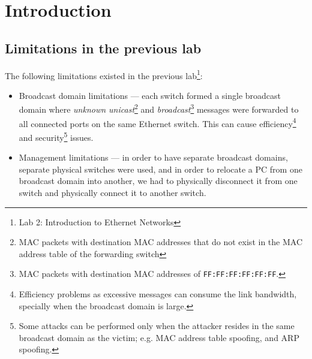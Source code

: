 \documentclass[pdftex,12pt,a4paper]{article}
\begin{document}
    \section{Introduction}
        \subsection{Limitations in the previous lab}
            The following limitations existed in the previous lab\footnote{Lab 2:
            Introduction to Ethernet Networks}:
            \begin{itemize}
                \item Broadcast domain limitations --- each switch formed a single
                    broadcast domain where \emph{unknown unicast}\footnote{MAC
                    packets with destination MAC addresses that do not exist in the
                    MAC address table of the forwarding switch} and
                    \emph{broadcast}\footnote{MAC packets with destination MAC
                    addresses of \texttt{FF:FF:FF:FF:FF:FF}.} messages were forwarded to
                    all connected ports on the same Ethernet switch.  This can cause
                    efficiency\footnote{Efficiency problems as excessive messages can
                    consume the link bandwidth, specially when the broadcast domain
                    is large.} and security\footnote{Some attacks can be performed only
                    when the attacker resides in the same broadcast domain as the
                    victim; e.g. MAC address table spoofing, and ARP spoofing.}
                    issues.
                \item Management limitations --- in order to have separate
                    broadcast domains, separate physical switches were used, and in
                    order to relocate a PC from one broadcast domain into another,
                    we had to physically disconnect it from one switch and
                    physically connect it to another switch.
            \end{itemize}
\end{document}
